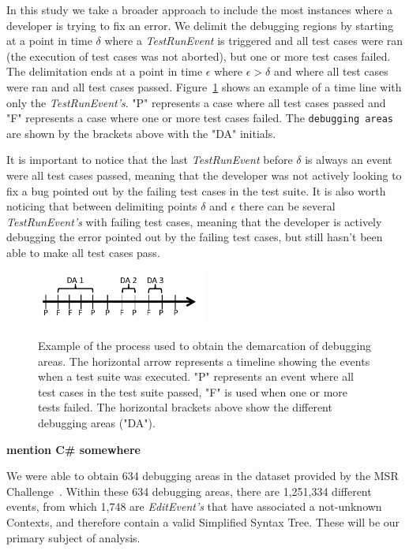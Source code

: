 \documentclass[sigconf]{acmart}
\newcommand{\todo}[1]
  {{\scriptsize \textbf{\color{red} {#1}}}}
\begin{document}
In this study we take a broader approach to include the most 
instances where a developer is trying to fix an error.
We delimit the debugging regions by starting at a point
in time $\delta$ where a \textit{TestRunEvent} is triggered and 
all test cases were ran (the execution of test cases
was not aborted), but one or more test cases failed.
The delimitation ends at a point in time $\epsilon $ where $ \epsilon > \delta$ 
and where all test cases were ran and all test cases passed.
Figure~\ref{demarcations} shows an example of a time line
with only the \textit{TestRunEvent's}. "P" represents a case
where all test cases passed and "F" represents a case where one
or more test cases failed. The \texttt{debugging areas} are shown by
the brackets above with the "DA" initials. 


It is important to notice that the last \textit{TestRunEvent} before $\delta$ 
is always an event were all test cases passed, meaning that the
developer was not actively looking to fix a bug pointed out by the
failing test cases in the test suite. It is also worth noticing
that between delimiting points $\delta$ and $\epsilon$ there can be 
several \textit{TestRunEvent's} with failing test cases, meaning
that the developer is actively debugging the error pointed out
by the failing test cases, but still hasn't been able to make
all test cases pass.

\begin{figure}[h]
\caption{Example of the process used to obtain the demarcation of
debugging areas. The horizontal arrow represents a timeline showing
the events when a test suite was executed. "P" 
represents an event where all test cases in the test suite
passed, "F" is used when one or more tests failed. The horizontal brackets
above show the different debugging areas ("DA").}
\centering
\includegraphics[width=0.5\textwidth]{images/demarcations.png}
\label{demarcations}
\end{figure}

\todo{mention C\# somewhere}

We were able to obtain 634 debugging areas in the dataset 
provided by the MSR Challenge~\cite{msr18challenge}.
Within these 634 debugging areas, there are 1,251,334
different events, from which 1,748 are \textit{EditEvent's}
that have associated a not-unknown Contexts, and therefore 
contain a valid Simplified Syntax Tree. These will be 
our primary subject of analysis.
\end{document}
